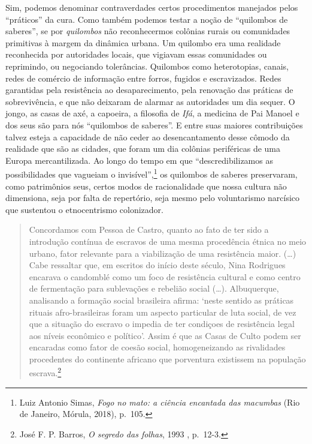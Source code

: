 Sim, podemos denominar contraverdades certos procedimentos manejados
pelos ``práticos'' da cura. Como também podemos testar a noção de
``quilombos de saberes'', se por \textit{quilombos} não reconhecermos
colônias rurais ou comunidades primitivas à margem da dinâmica urbana.
Um quilombo era uma realidade reconhecida por autoridades locais, que
vigiavam essas comunidades ou reprimindo, ou negociando tolerâncias.
Quilombos como heterotopias, canais, redes de comércio de informação
entre forros, fugidos e escravizados. Redes garantidas pela resistência
ao desaparecimento, pela renovação das práticas de sobrevivência, e que
não deixaram de alarmar as autoridades um dia sequer. O jongo, as casas
de axé, a capoeira, a filosofia de \textit{Ifá}, a medicina de Pai Manoel
e dos seus são para nós ``quilombos de saberes''. E entre suas maiores
contribuições talvez esteja a capacidade de não ceder ao desencantamento
desse cômodo da realidade que são as cidades, que foram um dia colônias
periféricas de uma Europa mercantilizada. Ao longo do tempo em que
``descredibilizamos as possibilidades que vagueiam o
invisível'',\footnote{Luiz Antonio Simas, \textit{Fogo no mato: a ciência
  encantada das macumbas} (Rio de Janeiro, Mórula, 2018), p.~105.} os
quilombos de saberes preservaram, como patrimônios seus, certos modos de
racionalidade que nossa cultura não dimensiona, seja por falta de
repertório, seja mesmo pelo voluntarismo narcísico que sustentou o
etnocentrismo colonizador.

\begin{quote}
Concordamos com Pessoa de Castro, quanto ao fato de ter sido a
introdução contínua de escravos de uma mesma procedência étnica no meio
urbano, fator relevante para a viabilização de uma resistência maior.
(\ldots{}) Cabe ressaltar que, em escritos do início deste século, Nina
Rodrigues encarava o candomblé como um foco de resistência cultural e
como centro de fermentação para sublevações e rebelião social (\dots{}).
Albuquerque, analisando a formação social brasileira afirma: `neste
sentido as práticas rituais afro-brasileiras foram um aspecto particular
de luta social, de vez que a situação do escravo o impedia de ter
condiçoes de resistência legal aos níveis econômico e político'. Assim é
que as Casas de Culto podem ser encaradas como fator de coesão social,
homogeneizando as rivalidades procedentes do continente africano que
porventura existissem na população escrava.\footnote{José F. P. Barros,
  \textit{O segredo das folhas}, 1993 , p.~12-3.}
\end{quote}


